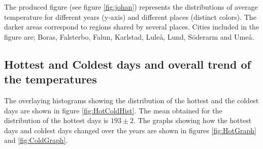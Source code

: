 \documentclass[a4paper]{article}
\begin{document}
The produced figure (see figure \ref{fig:johan}) represents the distributions of average temperature for different years (y-axis) and different places (distinct colors). The darker areas correspond to regions shared by several places. Cities included in the figure are; Boras, Falsterbo, Falun, Karlstad, Luleå, Lund, Söderarm and Umeå.


\subsection{Hottest and Coldest days and overall trend of the temperatures}

The overlaying histograms showing the distribution of the hottest and the coldest days are shown in figure \ref{fig:HotColdHist}.
The mean obtained for the distribution of the hottest days is $193 \pm 2$. The graphs showing how the hottest days and coldest days 
changed over the years are shown in figures  \ref{fig:HotGraph} and \ref{fig:ColdGraph}. 





\end{document}
